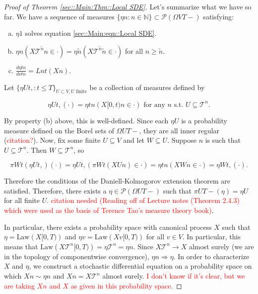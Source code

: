\documentclass[12pt]{article}
\newcommand{\mb}{\mathbb}
\newcommand{\mc}{\mathcal}
\newcommand{\ms}{\mathscr}
\newcommand{\ra}{\rightarrow}
\newcommand{\te}{\text}
\newcommand{\tr}{\textcolor{red}}
\newcommand{\ind}{\hspace{24pt}}
\newcommand{\pmsr}{\mc{P}}							%
\renewcommand{\v}{v}							%
\renewcommand{\U}{U}							%
\newcommand{\UU}{W}								%
\newcommand{\T}{T}								%
\renewcommand{\t}{t}							%
\newcommand{\proj}{\pi}							%
\newcommand{\X}{X}								%
\newcommand{\tree}{\mc{T}}						%
\newcommand{\sln}[1]{^{#1}}						%
\newcommand{\alt}[1]{\widetilde{#1}}			%
\newcommand{\mm}{\nu}							%
\newcommand{\mmm}{\eta}							%
\newcommand{\law}{\te{Law}}						%
\newcommand{\dense}{L}							%
\begin{document}
\begin{proof}[Proof of Theorem \ref{sec::Main:Thm::Local SDE}]
\ind Let's summarize what we have so far. We have a sequence of measures \(\{\mmm{}{}{n}:n\in\mb{N}\} \subset \pmsr(\Omega{ V}{\T-})\) satisfying:

\begin{enumerate}[(a)]
\item \(\mmm{}{}{1}\) solves equation \eqref{sec::Main:eqn::Local SDE}.

\item \(\mmm{}{}{n}(\X{\tree\sln{\alt{n}}}{}{n} \in \cdot) = \mmm{}{}{\alt{n}}(\X{\tree\sln{\alt{n}}}{}{\alt{n}}\in \cdot)\) for all \(n \geq \alt{n}\).

\item \(\frac{d\mmm{}{\t}{n}}{d\mm{}{\t}{n}} = \dense{n}{\t}(\X{}{}{n})\).
\end{enumerate}

Let \(\{\mmm{\U}{\t,}{}:\t \leq \T\}_{\U\subset  V,\U\te{ finite}}\) be a collection of measures defined by

\[\mmm{\U}{\t,}{}(\cdot) = \mmm{}{\t}{n}(\X{}{[0,\t)}{n} \in \cdot) \te{ for any }n\te{ s.t. }\U \subseteq \tree\sln{n}.\]

By property (b) above, this is well-defined. Since each \(\mmm{\U}{}{}\) is a probability measure defined on the Borel sets of \(\Omega{\U}{\T-}\), they are all inner regular (\tr{citation?}). Now, fix some finite \(\U\subseteq  V\) and let \(\UU \subseteq \U\). Suppose \(n\) is such that \(\U \subseteq \tree\sln{n}\). Then \(\UU\subseteq \tree\sln{n}\), so

\[\proj{\UU}{\t}(\mmm{\U}{\t,}{})(\cdot) = \mmm{\U}{\t,}{}\left(\proj{\UU}{\t}(\X{\U}{}{n}) \in \cdot\right) = \mmm{}{\t}{n}\left(\X{\UU}{}{n} \in \cdot\right) = \mmm{\UU}{\t,}{}(\cdot).\]

Therefore the conditions of the Daniell-Kolmogorov extension theorem are satisfied. Therefore, there exists a \(\mmm{}{}{}\in \ms{P}(\Omega{\U}{\T-})\) such that \(\proj{\U}{\T-}(\mmm{}{}{}) =\mmm{\U}{}{}\) for all finite \(\U\). \tr{citation needed (Reading off of Lecture notes (Theorem 2.4.3) which were used as the basis of Terence Tao's measure theory book)}.

\ind In particular, there exists a probability space with canonical process \(\X{}{}\) such that \(\mmm{}{}{} = \law(\X{}{[0,\T)})\) and \(\mmm{\v}{}{} = \law(\X{\v}{[0,\T)})\) for all \(\v \in  V\). In particular, this means that \(\law(\X{\tree\sln{n}}{[0,\T)}) = \mmm{\tree\sln{n}}{}{} = \mmm{}{}{n}\). Since \(\X{\tree\sln{n}}{} \ra \X{}{}\) almost surely (we are in the topology of componentwise convergence), \(\mmm{}{}{n} \Rightarrow \mmm{}{}{}\). In order to characterize \(\X{}{}\) and \(\mmm{}{}{}\), we construct a stochastic differential equation on a probability space on which \(\X{}{}{n} \sim \mmm{}{}{n}\) and \(\X{}{}{n} = \X{\tree\sln{n}}{}\) almost surely. \tr{I don't know if it's clear, but we are taking \(\X{}{}{n}\) and \(\X{}{}\) as given in this probability space.}


\end{proof}
\end{document}

